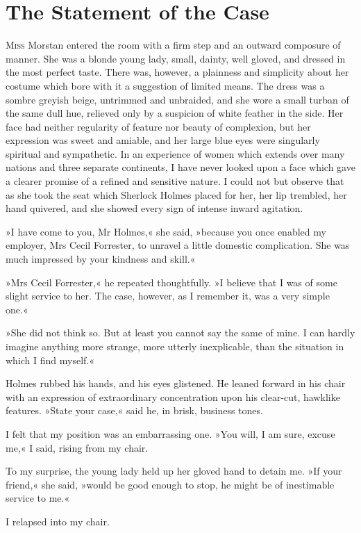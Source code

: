 \chapter{The Statement of the Case}
\lettrine[lines=4]{M}{iss} Morstan entered the room with a firm step and an outward composure of manner. She was a blonde young lady, small, dainty, well gloved, and dressed in the most perfect taste. There was, however, a plainness and simplicity about her costume which bore with it a suggestion of limited means. The dress was a sombre greyish beige, untrimmed and unbraided, and she wore a small turban of the same dull hue, relieved only by a suspicion of white feather in the side. Her face had neither regularity of feature nor beauty of complexion, but her expression was sweet and amiable, and her large blue eyes were singularly spiritual and sympathetic. In an experience of women which extends over many nations and three separate continents, I have never looked upon a face which gave a clearer promise of a refined and sensitive nature. I could not but observe that as she took the seat which Sherlock Holmes placed for her, her lip trembled, her hand quivered, and she showed every sign of intense inward agitation.

»I have come to you, Mr Holmes,« she said, »because you once enabled my employer, Mrs Cecil Forrester, to unravel a little domestic complication. She was much impressed by your kindness and skill.«

»Mrs Cecil Forrester,« he repeated thoughtfully. »I believe that I was of some slight service to her. The case, however, as I remember it, was a very simple one.«

»She did not think so. But at least you cannot say the same of mine. I can hardly imagine anything more strange, more utterly inexplicable, than the situation in which I find myself.«

Holmes rubbed his hands, and his eyes glistened. He leaned forward in his chair with an expression of extraordinary concentration upon his clear-cut, hawklike features. »State your case,« said he, in brisk, business tones.

I felt that my position was an embarrassing one. »You will, I am sure, excuse me,« I said, rising from my chair.

To my surprise, the young lady held up her gloved hand to detain me. »If your friend,« she said, »would be good enough to stop, he might be of inestimable service to me.«

I relapsed into my chair.

